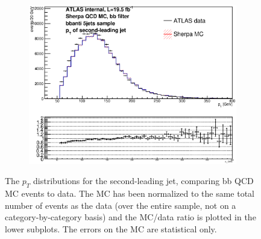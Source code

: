 \begin{figure}[phtb!]
\begin{center}
  \begin{subfigure}[$bbanti$ 5+ jet category]{0.3\textwidth}\includegraphics[width=\textwidth]{MonteCarlo/figures/pt1_bbanti_5jets.eps}\end{subfigure}
  \caption{The $p_T$ distributions for the second-leading jet, comparing bb QCD MC events to data.  The MC has been normalized
  to the same total number of events as the data (over the entire sample, not on a category-by-category basis)
  and the MC/data ratio is plotted in the lower subplots.  The errors on the MC are statistical only.
  \label{fig:bb_qcd_mc_pt1}}
    \end{center}
\end{figure}

